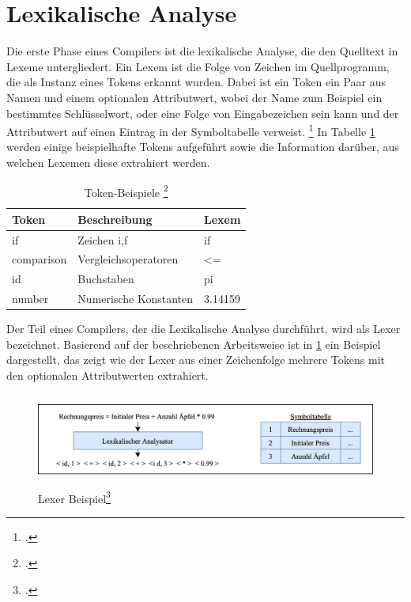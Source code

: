 \section{Lexikalische Analyse}
Die erste Phase eines Compilers ist die lexikalische Analyse,  die den Quelltext in Lexeme untergliedert.  Ein Lexem ist die Folge von Zeichen im Quellprogramm,  die als Instanz eines Tokens erkannt wurden.  Dabei ist ein Token ein Paar aus Namen und einem optionalen Attributwert,  wobei der Name zum Beispiel ein bestimmtes Schlüsselwort, oder eine Folge von Eingabezeichen sein kann und der Attributwert auf einen Eintrag in der Symboltabelle verweist.  \footcite[Vgl.][S. 135 f.]{Ullmann2008} In Tabelle \ref{tab:Tokens} werden einige beispielhafte Tokens aufgeführt sowie die Information darüber, aus welchen Lexemen diese extrahiert werden.

\begin{table}[!ht]
\begin{tabularx}{\textwidth}{l|X|l}
   \textbf{Token} & \textbf{Beschreibung} & \textbf{Lexem} \\
\hline
if             & Zeichen i,f           & if                      \\ 
comparison     & Vergleichsoperatoren  & \textless{}=            \\ 
id             & Buchstaben            & pi                      \\ 
number         & Numerische Konstanten    & 3.14159                  
\end{tabularx}
\caption[Token-Beispiele]{Token-Beispiele \protect\footcite{Ullmann2008}}
 \label{tab:Tokens}
\end{table}

Der Teil eines Compilers,  der die Lexikalische Analyse durchführt,  wird als Lexer bezeichnet.  Basierend auf der beschriebenen Arbeitsweise ist in \ref{fig:LexerResult} ein Beispiel dargestellt, das zeigt wie der Lexer aus einer Zeichenfolge mehrere Tokens mit den optionalen Attributwerten extrahiert.  
 
\begin{figure}[!ht]
 \includegraphics[width=14.5cm,height=3cm]{Images/Compiler/LexerResult.png}
 \caption[Lexer Beispiel]{Lexer Beispiel\protect\footcite{Ullmann2008}}
 \label{fig:LexerResult}
\end{figure}

